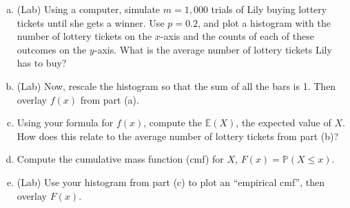 \documentclass[]{article}
\newif\ifsolutions
\renewcommand{\answer}[1]{{\color{mydarkblue}\textbf{Solution:}#1}}
\begin{document}
\begin{qunlist}
\begin{enumerate}[a)]
\ifsolutions{ \answer{ The probability of getting $(x-1)$ non-winning lottery tickets is $(1-p)^{x-1}$. Therefore the probability of getting $(x-1)$ non-winning tickets, then a winning ticket is
	\[ P(X=x) = (1-p)^{x-1} p. \]
	To show this is a valid probability distribution, we need to make sure the sum of $f(x)$ over all possible $x$ is 1. Using the formula for an infinite geometric series,
	\[ \sum_{x=1}^{\infty} f(x) = p \sum_{x=1}^{\infty} (1-p)^{x-1} = p \cdot \frac{1}{1-(1-p)} = 1. \]
}}\fi

\qpart
\item (Lab) Using a computer, simulate $m=1,000$ trials of Lily buying lottery tickets until she gets a winner. Use $p=0.2$, and plot a histogram with the number of lottery tickets on the $x$-axis and the counts of each of these outcomes on the $y$-axis.  What is the average number of lottery tickets Lily has to buy?

\qpart
\item (Lab) Now, rescale the histogram so that the sum of all the bars is 1.  Then overlay $f(x)$ from part (a).

\qpart
\item Using your formula for $f(x)$, compute the $\mathbb{E}(X)$, the expected value of $X$. How does this relate to the average number of lottery tickets from part (b)? %


\qpart
\item Compute the cumulative mass function (cmf) for $X$, $F(x) = \mathbb{P}(X \leq x)$.

\ifsolutions{ \answer{ 
	We can use the formula for a finite geometric series to find $F(x)$,
	\[ F(x) = p \sum_{y=1}^x (1-p)^{y-1} = p \cdot \frac{1 - (1-p)^x}{1 - (1-p)} = 1 - (1-p)^x. \]
}}\fi

\qpart
\item (Lab) Use your histogram from part (c) to plot an ``empirical cmf'', then overlay $F(x)$.

\end{enumerate}



\end{qunlist}
\end{document}
